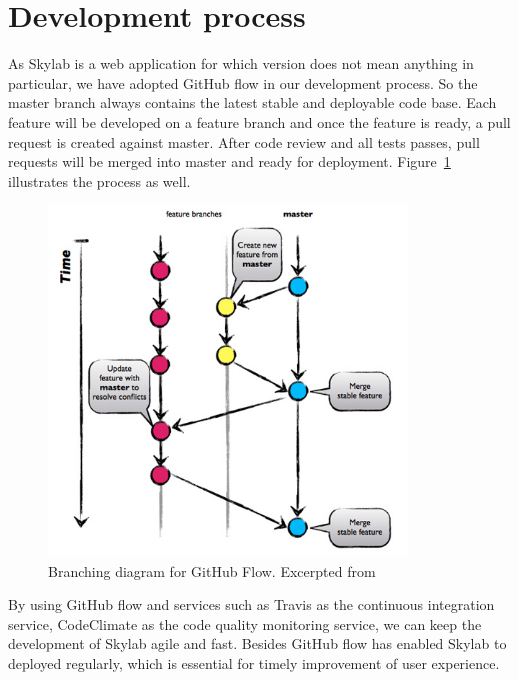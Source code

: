 \section{Development process}

As Skylab is a web application for which version does not mean anything in particular, we have adopted GitHub flow in our development process\cite{citation8}. So the master branch always contains the latest stable and deployable code base. Each feature will be developed on a feature branch and once the feature is ready, a pull request is created against master. After code review and all tests passes, pull requests will be merged into master and ready for deployment. Figure~\ref{fig:GithubFlow} illustrates the process as well.

\begin{figure}[h]
  \centering
  \includegraphics[width=0.85\textwidth]{Images/Github_Flow_Branching_Model.jpg}
  \caption{Branching diagram for GitHub Flow. Excerpted from \cite{citation8}}
  \label{fig:GithubFlow}
\end{figure}

By using GitHub flow and services such as Travis as the continuous integration service, CodeClimate as the code quality monitoring service, we can keep the development of Skylab agile and fast. Besides GitHub flow has enabled Skylab to deployed regularly, which is essential for timely improvement of user experience\cite{citation9}.
